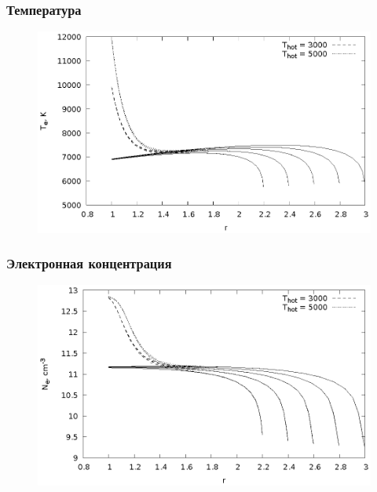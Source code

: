 \documentclass{beamer}
\begin{document}
\begin{frame}
\frametitle{Температура}
\begin{figure}[!h]
\includegraphics[width=\textwidth]{T_e.eps}
\end{figure}
\end{frame}


\begin{frame}
\frametitle{Электронная концентрация}
\begin{figure}[!h]
\includegraphics[width=\textwidth]{N_e.eps}
\end{figure}
\end{frame}

\end{document}
